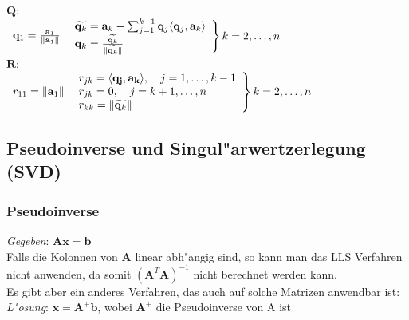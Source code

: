 \documentclass[german, 10pt, a4paper, twocolumn]{scrartcl}
\begin{document}
$\mathbf{Q}$:\\
$
\begin{array}{c}\mathbf{q}_1=\frac{\mathbf{a}_1}{\|\mathbf{a}_1\|}\end{array}\\
\left.\begin{array}{l}
 \widetilde{\mathbf{q}_k}=\mathbf{a}_k-\sum^{k-1}_{j=1}\mathbf{q}_j\langle \mathbf{q}_j, \mathbf{a}_k\rangle\\
 \mathbf{q}_k=\frac{\widetilde{\mathbf{q}_k}}{\|\widetilde{\mathbf{q}_k}\|}
\end{array}
\right \} k=2,\ldots,n
$\\

$\mathbf{R}$:\\
$
\begin{array}{l}r_{11}=\|\mathbf{a}_1\|\end{array}\\
\left.\begin{array}{l}
r_{jk}=\langle \mathbf{q_j},\mathbf{a_k}\rangle ,\quad j=1,\ldots,k-1\\
r_{jk}=0,\quad j=k+1,\ldots,n\\
r_{kk}=\|\widetilde{\mathbf{q}_k}\|
\end{array} \right \} k=2,\ldots,n
$

\subsection{Pseudoinverse und Singul"arwertzerlegung (SVD)}


\subsubsection{Pseudoinverse}

\textit{Gegeben}: $\mathbf{Ax}=\mathbf{b}$\\

Falls die Kolonnen von $\mathbf{A}$ linear abh"angig sind, so kann man das LLS Verfahren nicht anwenden, da somit $(\mathbf{A}^T\mathbf{A})^{-1}$ nicht berechnet werden kann.\\

Es gibt aber ein anderes Verfahren, das auch auf solche Matrizen anwendbar ist:\\

\textit{L"osung}: $\mathbf{x}=\mathbf{A}^{+}\mathbf{b}$, wobei $\mathbf{A}^{+}$ die Pseudoinverse von A ist\\
\end{document}
